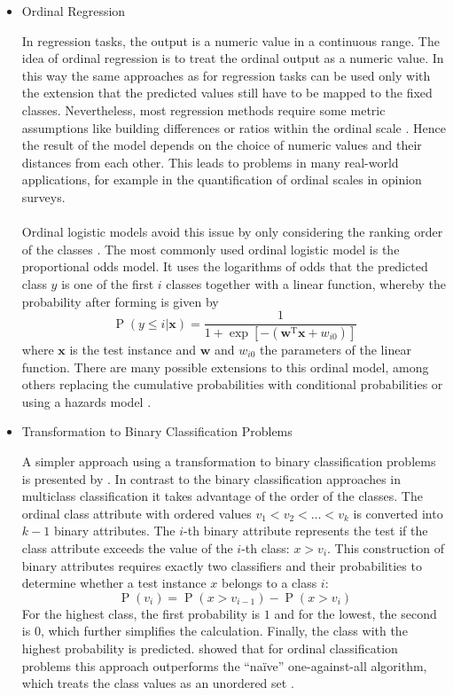 \documentclass[article,type=msc,colorback,accentcolor=tud7b]{tudthesis}
\begin{document}
    \begin{itemize}
      \item Ordinal Regression

        In regression tasks, the output is a numeric value in a continuous range. The idea of ordinal regression is to treat the ordinal output as a numeric value. In this way the same approaches as for regression tasks can be used only with the extension that the predicted values still have to be mapped to the fixed classes. Nevertheless, most regression methods require some metric assumptions like building differences or ratios within the ordinal scale \autocite[Section~1]{Ruan2014}. Hence the result of the model depends on the choice of numeric values and their distances from each other. This leads to problems in many real-world applications, for example in the quantification of ordinal scales in opinion surveys. \\\\
        Ordinal logistic models avoid this issue by only considering the ranking order of the classes \autocite[Chapter~13]{Harrell2015}. The most commonly used ordinal logistic model is the proportional odds model. It uses the logarithms of odds that the predicted class $y$ is one of the first $i$ classes together with a linear function, whereby the probability after forming is given by
        \[\operatorname{P}(y\leq i|\mathbf{x})=\frac{1}{1+\exp\left[-\left(\mathbf{w}^{\mathrm{T}}\mathbf{x}+w_{i 0}\right)\right]}\]
        where $\mathbf{x}$ is the test instance and $\mathbf{w}$ and $w_{i 0}$ the parameters of the linear function. There are many possible extensions to this ordinal model, among others replacing the cumulative probabilities with conditional probabilities or using a hazards model \autocite[Chapter~13]{Harrell2015}. 
      \item Transformation to Binary Classification Problems
      
        A simpler approach using a transformation to binary classification problems is presented by \citeauthor{Frank2001}. In contrast to the binary classification approaches in multiclass classification it takes advantage of the order of the classes. The ordinal class attribute with ordered values $v_{1}<v_{2}<\dots< v_{k}$ is converted into $k-1$ binary attributes. The $i$-th binary attribute represents the test if the class attribute exceeds the value of the $i$-th class: $x>v_{i}$. This construction of binary attributes requires exactly two classifiers and their probabilities to determine whether a test instance $x$ belongs to a class $i$:
        \[\operatorname{P}\left(v_{i}\right)=\operatorname{P}\left(x>v_{i-1}\right)-\operatorname{P}\left(x>v_{i}\right)\]
        For the highest class, the first probability is $1$ and for the lowest, the second is $0$, which further simplifies the calculation. Finally, the class with the highest probability is predicted. \citeauthor{Frank2001} showed that for ordinal classification problems this approach outperforms the “naïve” one-against-all algorithm, which treats the class values as an unordered set \autocite{Frank2001}.
    \end{itemize}
  
\end{document}
